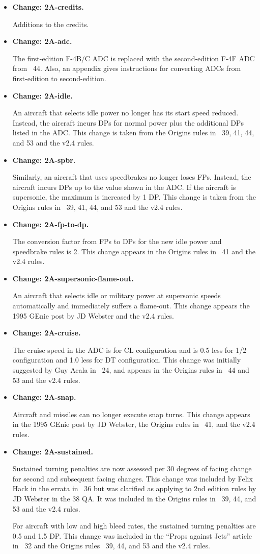 \documentclass[10pt]{report}
\newcommand{\itemtag}[1]{\item \textbf{Change: #1.}\par}
\begin{document}
\begin{itemize}

    \itemtag{2A-credits} Additions to the credits.

    \itemtag{2A-adc} The first-edition F-4B/C ADC is replaced with the second-edition F-4F ADC from {\APJ}~44. Also, an appendix gives instructions for converting ADCs from first-edition to second-edition.

    \itemtag{2A-idle} An aircraft that selects idle power no longer has its start speed reduced. Instead, the aircraft incurs DPs for normal power plus the additional DPs listed in the ADC. This change is taken from the Origins rules in {\APJ}~39, 41, 44, and 53 and the v2.4 rules. 

    \itemtag{2A-spbr} Similarly, an aircraft that uses speedbrakes no longer loses FPs. Instead, the aircraft incurs DPs up to the value shown in the ADC. If the aircraft is supersonic, the maximum is increased by 1 DP. This change is taken from the Origins rules in {\APJ}~39, 41, 44, and 53 and the v2.4 rules.

    \itemtag{2A-fp-to-dp} The conversion factor from FPs to DPs for the new idle power and speedbrake rules is 2. This change appears in the Origins rules in {\APJ}~41 and the v2.4 rules.

    \itemtag{2A-supersonic-flame-out} An aircraft that selects idle or military power at supersonic speeds automatically and immediately suffers a flame-out. This change appears the 1995 GEnie post by JD Webster and the v2.4 rules.

    \itemtag{2A-cruise} The cruise speed in the ADC is for CL configuration and is 0.5 less for 1/2 configuration and 1.0 less for DT configuration. This change was initially suggested by Guy Acala in {\APJ}~24, and appears in the Origins rules in {\APJ}~44 and 53 and the v2.4 rules.

    \itemtag{2A-snap} Aircraft and missiles can no longer execute snap turns. This change appears in the 1995 GEnie post by JD Webster, the Origins rules in {\APJ}~41, and the v2.4 rules.

    \itemtag{2A-sustained} Sustained turning penalties are now assessed per 30 degrees of facing change for second and subsequent facing changes. This change was included by Felix Hack in the errata in {\APJ}~36 but was clarified as applying to 2nd edition rules by JD Webster in the {\APJ} 38 QA. It was included in the Origins rules in {\APJ}~39, 44, and 53 and the v2.4 rules.

    For aircraft with low and high bleed rates, the sustained turning penalties are 0.5 and 1.5 DP. This change was included in the “Props against Jets” article in {\APJ}~32 and the Origins rules {\APJ}~39, 44, and 53 and the v2.4 rules.


\end{itemize}
\end{document}
